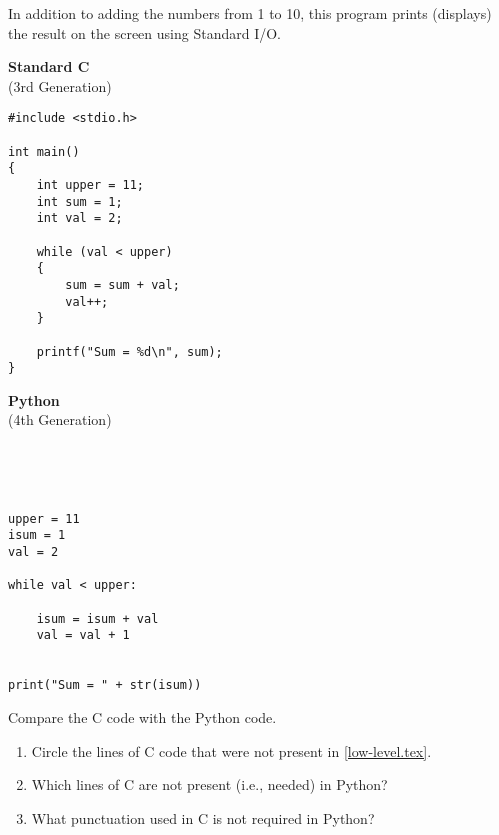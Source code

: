 
In addition to adding the numbers from 1 to 10, this program prints (displays) the result on the screen using Standard I/O.

\begin{center}
\begin{minipage}[t]{186pt}

\textbf{Standard C} \\
(3rd Generation)

\begin{verbatim}
#include <stdio.h>

int main()
{
    int upper = 11;
    int sum = 1;
    int val = 2;

    while (val < upper)
    {
        sum = sum + val;
        val++;
    }

    printf("Sum = %d\n", sum);
}
\end{verbatim}
\end{minipage}
\hspace{1ex}\vline\hspace{1ex}
\begin{minipage}[t]{168pt}

\textbf{Python} \\
(4th Generation)

\begin{verbatim}




upper = 11
isum = 1
val = 2

while val < upper:

    isum = isum + val
    val = val + 1


print("Sum = " + str(isum))
\end{verbatim}
\end{minipage}
\end{center}




\Q Compare the C code with the Python code.

\begin{enumerate}
\item Circle the lines of C code that were not present in \ref{low-level.tex}.

\item Which lines of C are not present (i.e., needed) in Python?

\item What punctuation used in C is not required in Python?

\end{enumerate}


